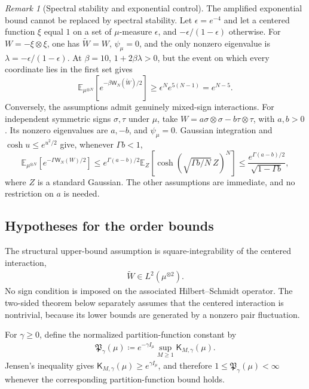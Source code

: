 \documentclass[11pt,reqno]{amsart}
\numberwithin{equation}{section}
\theoremstyle{plain}
\theoremstyle{remark}
\newtheorem{remark}[remark]{Remark}
\newcommand{\E}{{\mathbb{E}}}
\newcommand{\K}{{\mathsf{K}}}
\newcommand{\tl}{\widetilde}
\newcommand{\be}{\beta}
\begin{document}
\begin{remark}[Spectral stability and exponential control]
\label{rem:signed-spectral-not-sufficient}
The amplified exponential bound cannot be replaced by spectral stability.
Let $\epsilon=e^{-4}$ and let a centered function $\xi$ equal $1$ on a set
of $\mu$-measure $\epsilon$, and $-\epsilon/(1-\epsilon)$ otherwise.  For
$W=-\xi\otimes\xi$, one has $\tl W=W$, $\psi_\mu=0$, and the only nonzero
eigenvalue is $\lambda=-\epsilon/(1-\epsilon)$.  At $\be=10$,
$1+2\be\lambda>0$, but the event on which every coordinate lies in the
first set gives
\begin{equation}\label{eq:signed-spectral-counterexample}
 \E_{\mu^{\otimes N}}\left[e^{-\be\mathsf W_N(\tl W)/2}\right]
 \geq\epsilon^N e^{5(N-1)}=e^{N-5}.
\end{equation}
Conversely, the assumptions admit genuinely mixed-sign interactions.
For independent symmetric signs $\sigma,\tau$ under $\mu$, take
$W=a\sigma\otimes\sigma-b\tau\otimes\tau$, with $a,b>0$.  Its nonzero
eigenvalues are $a,-b$, and $\psi_\mu=0$.  Gaussian integration and
$\cosh u\leq e^{u^2/2}$ give, whenever $\Gamma b<1$,
\begin{equation}\label{eq:signed-mixed-example}
 \E_{\mu^{\otimes N}}\left[e^{-\Gamma\mathsf W_N(W)/2}\right]
 \leq e^{\Gamma(a-b)/2}\E_Z
       \left[\cosh\left(\sqrt{\Gamma b/N}\,Z\right)^N\right]
 \leq\frac{e^{\Gamma(a-b)/2}}{\sqrt{1-\Gamma b}},
\end{equation}
where $Z$ is a standard Gaussian.  The other assumptions are immediate,
and no restriction on $a$ is needed.
\end{remark}

\subsection{Hypotheses for the order bounds}
\label{subsec:quantitative-hypotheses}

The structural upper-bound assumption is square-integrability of the centered interaction,
\begin{align}\label{eq:structural-L2-intro}
 \tl W\in L^2(\mu^{\otimes2}).
\end{align}
No sign condition is imposed on the associated Hilbert--Schmidt operator.  The two-sided theorem below separately assumes that the centered interaction is nontrivial, because its lower bounds are generated by a nonzero pair fluctuation.

For \(\gamma\ge0\), define the normalized partition-function constant by
\begin{align}\label{eq:normalized-pf-constant}
 \mathfrak P_\gamma(\mu)
 \coloneqq e^{-\gamma I_\mu}\sup_{M\ge1}\K_{M,\gamma}(\mu).
\end{align}
Jensen's inequality gives \(\K_{M,\gamma}(\mu)\ge e^{\gamma I_\mu}\), and therefore \(1\le\mathfrak P_\gamma(\mu)<\infty\) whenever the corresponding partition-function bound holds.
\end{document}
